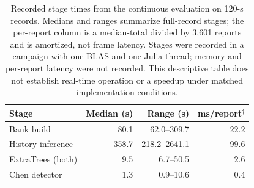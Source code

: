 \begin{table}[t]\centering\small\setlength{\tabcolsep}{3pt}
\caption{Recorded stage times from the continuous evaluation on 120-s records. Medians and ranges summarize full-record stages; the per-report column is a median-total divided by 3,601 reports and is amortized, not frame latency. Stages were recorded in a campaign with one BLAS and one Julia thread; memory and per-report latency were not recorded. This descriptive table does not establish real-time operation or a speedup under matched implementation conditions.}
\label{tab:closure-compute-cost}
\begin{tabular}{@{}lrrr@{}}\toprule
Stage & Median (s) & Range (s) & ms/report$^\dagger$ \\\midrule
Bank build & 80.1 & 62.0--309.7 & 22.2 \\
History inference & 358.7 & 218.2--2641.1 & 99.6 \\
ExtraTrees (both) & 9.5 & 6.7--50.5 & 2.6 \\
Chen detector & 1.3 & 0.9--10.6 & 0.4 \\
\bottomrule\end{tabular}\end{table}
